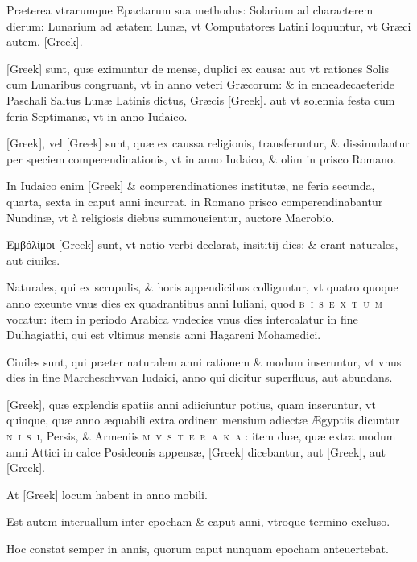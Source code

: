 \begin{parnumbers}

Præterea vtrarumque Epactarum sua methodus: Solarium ad characterem dierum: Lunarium ad ætatem Lunæ, vt Computatores Latini loquuntur, vt  Græci autem, \textgreek{[Greek]}.

\textgreek{[Greek]} sunt, quæ eximuntur de mense, duplici ex causa: aut vt rationes Solis cum Lunaribus congruant, vt in anno veteri Græcorum: \& in enneadecaeteride Paschali Saltus Lunæ Latinis dictus, Græcis \textgreek{[Greek]}. aut vt solennia festa cum feria Septimanæ, vt in anno Iudaico.

\textgreek{[Greek]}, vel \textgreek{[Greek]} sunt, quæ ex caussa religionis, transferuntur, \& dissimulantur per speciem comperendinationis, vt in anno Iudaico, \& olim in prisco Romano.

In Iudaico enim \textgreek{[Greek]} \& comperendinationes institutæ, ne feria secunda, quarta, sexta in caput anni incurrat. in Romano prisco comperendinabantur Nundinæ, vt à religiosis diebus summoueientur, auctore Macrobio.

\textgreek{Εμβόλίμοι [Greek]} sunt, vt notio verbi declarat, insititij  dies: \& erant naturales, aut ciuiles.

Naturales, qui ex scrupulis, \& horis appendicibus colliguntur, vt quatro quoque anno exeunte vnus dies ex quadrantibus anni Iuliani, quod \textsc{b~i~s~e~x~t~u~m} vocatur: item in periodo Arabica vndecies vnus dies intercalatur in fine Dulhagiathi, qui est vltimus mensis anni Hagareni Mohamedici.

Ciuiles sunt, qui præter naturalem anni rationem \& modum inseruntur, vt vnus dies in fine Marcheschvvan Iudaici, anno qui dicitur superfluus, aut abundans.

\textgreek{[Greek]}, quæ explendis spatiis anni adiiciuntur potius, quam inseruntur, vt quinque, quæ anno æquabili extra ordinem mensium adiectæ Ægyptiis dicuntur \textsc{n~i~s~i}, Persis, \& Armeniis \textsc{m~v~s~t~e~r~a~k~a} : item duæ, quæ extra modum anni Attici in calce Posideonis  appensæ, \textgreek{[Greek]} dicebantur, aut \textgreek{[Greek]}, aut \textgreek{[Greek]}.

At \textgreek{[Greek]} locum habent in anno mobili.

Est autem interuallum inter epocham \& caput anni, vtroque termino excluso.

Hoc constat semper in annis, quorum caput nunquam epocham anteuertebat.


\end{parnumbers}
